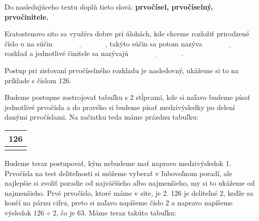\documentclass[12pt]{article}
\begin{document}
	Do nasledujúceho textu doplň tieto slová: \textbf{prvočísel, prvočíselný, prvočinitele.}
	\newline
	
	Eratostenovo sito sa využíva dobre pri úlohách, kde chceme rozložiť prirodzené  číslo $n$ na súčin  $\underline{\hspace{3cm}}$, takýto súčin sa potom nazýva $\underline{\hspace{3cm}}$ rozklad a jednotlivé činitele sa nazývajú $\underline{\hspace{3cm}}$.
	
	Postup pri zisťovaní prvočíselného rozkladu je nasledovný, ukážeme si to na príklade s číslom 126.
	\newline
	
	Budeme postupne zostrojovať tabuľku s 2 stĺpcami, kde si naľavo budeme písať jednotlivé prvočísla a do pravého si budeme písať medzivýsledky po delení danými prvočíslami. Na začiatku teda máme prázdnu tabuľku:
	
	\begin{table}[!hbt]
		\centering
		\begin{tabular}{|l|l|}
			\hline
			\multicolumn{2}{|c|}{126}\\
			\hline
			& \\
			
			\hline
		\end{tabular}
		
	\end{table}
	Budeme teraz postupovať, kým nebudeme mať napravo medzivýsledok 1. Prvočísla na test deliteľnosti si môžeme vyberať v ľubovoľnom poradí, ale najlepšie si zvoliť poradie od najväčšieho albo najmenšieho, my si to ukážeme od najmenšieho.
	\newline
	Prvé prvočíslo, ktoré máme v site, je 2. 126 je deliteľné 2, keďže sa končí na párnu cifru, preto si naľavo napíšeme číslo 2 a napravo napíšeme výsledok $126 \div 2$, čo je 63. Máme teraz takúto tabuľku:
	\newline
	
\end{document}

